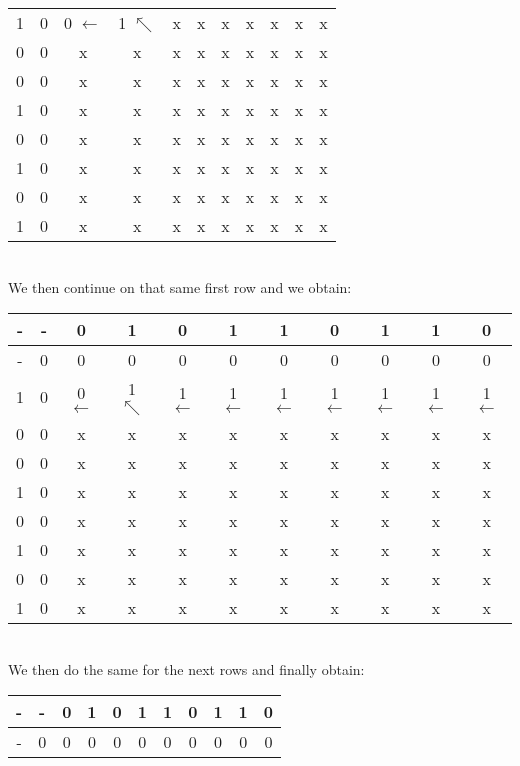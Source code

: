 \documentclass[11pt]{article}
\begin{document}
\begin{enumerate}
\begin{tabular}{ c | c c c c c c c c c c }
        1 & 0 & 0 $\leftarrow$ & 1 $\nwarrow$ & x & x & x & x & x & x & x \\
        0 & 0 & x & x & x & x & x & x & x & x & x \\
        0 & 0 & x & x & x & x & x & x & x & x & x \\
        1 & 0 & x & x & x & x & x & x & x & x & x \\
        0 & 0 & x & x & x & x & x & x & x & x & x \\
        1 & 0 & x & x & x & x & x & x & x & x & x \\
        0 & 0 & x & x & x & x & x & x & x & x & x \\
        1 & 0 & x & x & x & x & x & x & x & x & x \\
    \end{tabular}
    \\ We then continue on that same first row and we obtain: \\
    \begin{tabular}{ c | c c c c c c c c c c } 
        - & - & 0 & 1 & 0 & 1 & 1 & 0 & 1 & 1 & 0 \\
        \hline
        - & 0 & 0 & 0 & 0 & 0 & 0 & 0 & 0 & 0 & 0 \\
        1 & 0 & 0 $\leftarrow$ & 1 $\nwarrow$ & 1 $\leftarrow$ & 1 $\leftarrow$ & 1 $\leftarrow$ & 1 $\leftarrow$ & 1 $\leftarrow$ & 1 $\leftarrow$ & 1 $\leftarrow$ \\
        0 & 0 & x & x & x & x & x & x & x & x & x \\
        0 & 0 & x & x & x & x & x & x & x & x & x \\
        1 & 0 & x & x & x & x & x & x & x & x & x \\
        0 & 0 & x & x & x & x & x & x & x & x & x \\
        1 & 0 & x & x & x & x & x & x & x & x & x \\
        0 & 0 & x & x & x & x & x & x & x & x & x \\
        1 & 0 & x & x & x & x & x & x & x & x & x \\
    \end{tabular}
    \\ We then do the same for the next rows and finally obtain: \\
    \begin{tabular}{ c | c c c c c c c c c c } 
        - & - & 0 & 1 & 0 & 1 & 1 & 0 & 1 & 1 & 0 \\
        \hline
        - & 0 & 0 & 0 & 0 & 0 & 0 & 0 & 0 & 0 & 0 \\

\end{tabular}
\end{enumerate}
\end{document}
